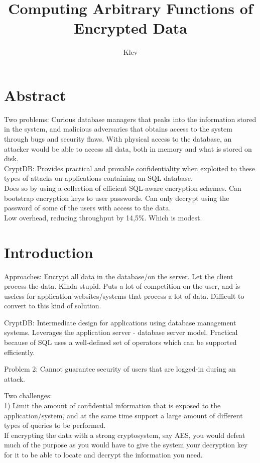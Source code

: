 \documentclass[10pt]{article}
\begin{document}
\author{Klev}
\title{Computing Arbitrary Functions of Encrypted Data}
\maketitle

\section{Abstract}

Two problems: Curious database managers that peaks into the information stored in the system, and malicious adversaries that obtains access to the system through bugs and security flaws. With physical access to the database, an attacker would be able to access all data, both in memory and what is stored on disk.\\

CryptDB: Provides practical and provable confidentiality when exploited to these types of attacks on applications containing an SQL database.
\\

Does so by using a collection of efficient SQL-aware encryption schemes. Can bootstrap encryption keys to user passwords. Can only decrypt using the password of some of the users with access to the data.
\\

Low overhead, reducing throughput by 14,5\%. Which is modest.

\section{Introduction}

Approaches: Encrypt all data in the database/on the server. Let the client process the data. Kinda stupid. Puts a lot of competition on the user, and is useless for application websites/systems that process a lot of data. Difficult to convert to this kind of solution.

CryptDB: Intermediate design for applications using database management systems. Leverages the application server - database server model. Practical because of SQL uses a well-defined set of operators which can be supported efficiently.

Problem 2: Cannot guarantee security of users that are logged-in during an attack.

Two challenges:\\

1) Limit the amount of confidential information that is exposed to the application/system, and at the same time support a large amount of different types of queries to be performed.\\
If encrypting the data with a strong cryptosystem, say AES, you would defeat much of the purpose as you would have to give the system your decryption key for it to be able to locate and decrypt the information you need.\\
\end{document}
